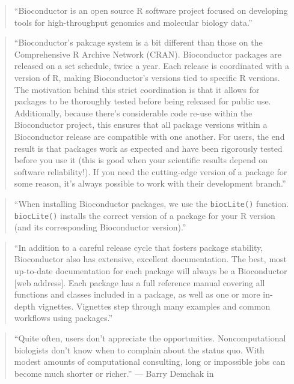 \documentclass[]{tufte-book}
\begin{document}
\begin{quote}
``Bioconductor is an open source R software project focused on developing tools
for high-throughput genomics and molecular biology data.'' \citep{buffalo2015bioinformatics}
\end{quote}

\begin{quote}
``Bioconductor's pakcage system is a bit different than those on the Comprehensive R
Archive Network (CRAN). Bioconductor packages are released on a set schedule, twice
a year. Each release is coordinated with a version of R, making Bioconductor's versions
tied to specific R versions. The motivation behind this strict coordination is that it
allows for packages to be thoroughly tested before being released for public use.
Additionally, because there's considerable code re-use within the Bioconductor project,
this ensures that all package versions within a Bioconductor release are compatible
with one another. For users, the end result is that packages work as expected and
have been rigorously tested before you use it (this is good when your scientific
results depend on software reliability!). If you need the cutting-edge version of a
package for some reason, it's always possible to work with their development branch.''
\citep{buffalo2015bioinformatics}
\end{quote}

\begin{quote}
``When installing Bioconductor packages, we use the \texttt{biocLite()} function. \texttt{biocLite()}
installs the correct version of a package for your R version (and its corresponding
Bioconductor version).'' \citep{buffalo2015bioinformatics}
\end{quote}

\begin{quote}
``In addition to a careful release cycle that fosters package stability, Bioconductor
also has extensive, excellent documentation. The best, most up-to-date documentation
for each package will always be a Bioconductor {[}web address{]}. Each package has a full
reference manual covering all functions and classes included in a package,
as well as one or more in-depth vignettes. Vignettes step through many examples and
common workflows using packages.'' \citep{buffalo2015bioinformatics}
\end{quote}

\begin{quote}
``Quite often, users don't appreciate the opportunities. Noncomputational
biologists don't know when to complain about the status quo. With modest amounts
of computational consulting, long or impossible jobs can become much shorter or
richer.'' --- Barry Demchak in \citep{altschul2013anatomy}
\end{quote}
\end{document}
